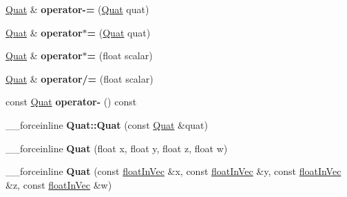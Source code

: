 \begin{DoxyCompactItemize}
\item 
\hypertarget{classVectormath_1_1Aos_1_1Quat_ae717ade08285c84c7ca192662f505fc7}{\hyperlink{classVectormath_1_1Aos_1_1Quat}{Quat} \& {\bfseries operator-\/=} (\hyperlink{classVectormath_1_1Aos_1_1Quat}{Quat} quat)}\label{classVectormath_1_1Aos_1_1Quat_ae717ade08285c84c7ca192662f505fc7}

\item 
\hypertarget{classVectormath_1_1Aos_1_1Quat_a9e632807f312080d969ec2b11cec1911}{\hyperlink{classVectormath_1_1Aos_1_1Quat}{Quat} \& {\bfseries operator$\ast$=} (\hyperlink{classVectormath_1_1Aos_1_1Quat}{Quat} quat)}\label{classVectormath_1_1Aos_1_1Quat_a9e632807f312080d969ec2b11cec1911}

\item 
\hypertarget{classVectormath_1_1Aos_1_1Quat_ab5da49301367b36085a58c53734433c9}{\hyperlink{classVectormath_1_1Aos_1_1Quat}{Quat} \& {\bfseries operator$\ast$=} (float scalar)}\label{classVectormath_1_1Aos_1_1Quat_ab5da49301367b36085a58c53734433c9}

\item 
\hypertarget{classVectormath_1_1Aos_1_1Quat_a5af07567b079fe049ca809335c5c3848}{\hyperlink{classVectormath_1_1Aos_1_1Quat}{Quat} \& {\bfseries operator/=} (float scalar)}\label{classVectormath_1_1Aos_1_1Quat_a5af07567b079fe049ca809335c5c3848}

\item 
\hypertarget{classVectormath_1_1Aos_1_1Quat_ac98a921fa0caecefd842fef175f84f9b}{const \hyperlink{classVectormath_1_1Aos_1_1Quat}{Quat} {\bfseries operator-\/} () const }\label{classVectormath_1_1Aos_1_1Quat_ac98a921fa0caecefd842fef175f84f9b}

\item 
\hypertarget{classVectormath_1_1Aos_1_1Quat_ad57febc62279c1c9cad987a70fc5ce9a}{\-\_\-\-\_\-forceinline {\bfseries Quat\-::\-Quat} (const \hyperlink{classVectormath_1_1Aos_1_1Quat}{Quat} \&quat)}\label{classVectormath_1_1Aos_1_1Quat_ad57febc62279c1c9cad987a70fc5ce9a}

\item 
\hypertarget{classVectormath_1_1Aos_1_1Quat_a4a18fd2e45d5e8f61ae896dfa423caff}{\-\_\-\-\_\-forceinline {\bfseries Quat} (float x, float y, float z, float w)}\label{classVectormath_1_1Aos_1_1Quat_a4a18fd2e45d5e8f61ae896dfa423caff}

\item 
\hypertarget{classVectormath_1_1Aos_1_1Quat_a6364d7dbe69cfed9fe3c9e573d17955c}{\-\_\-\-\_\-forceinline {\bfseries Quat} (const \hyperlink{classVectormath_1_1floatInVec}{float\-In\-Vec} \&x, const \hyperlink{classVectormath_1_1floatInVec}{float\-In\-Vec} \&y, const \hyperlink{classVectormath_1_1floatInVec}{float\-In\-Vec} \&z, const \hyperlink{classVectormath_1_1floatInVec}{float\-In\-Vec} \&w)}\label{classVectormath_1_1Aos_1_1Quat_a6364d7dbe69cfed9fe3c9e573d17955c}


\end{DoxyCompactItemize}
